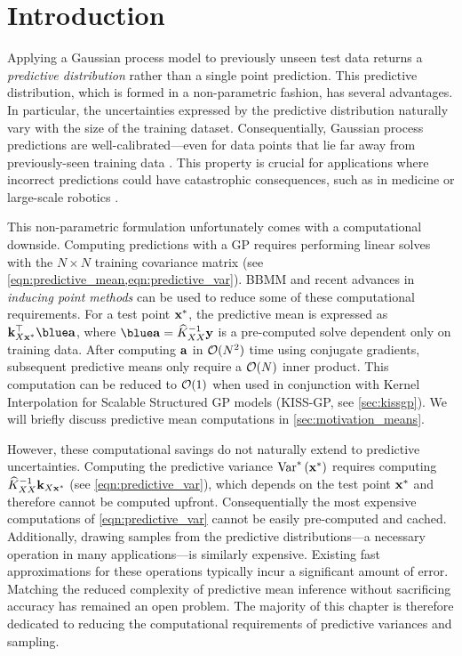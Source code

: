 \section{Introduction}
Applying a Gaussian process model to previously unseen test data returns a \emph{predictive distribution} rather than a single point prediction.
This predictive distribution, which is formed in a non-parametric fashion, has several advantages.
In particular, the uncertainties expressed by the predictive distribution naturally vary with the size of the training dataset.
Consequentially, Gaussian process predictions are well-calibrated---even for data points that lie far away from previously-seen training data \cite{rasmussen2001occam,wilson2014thesis}.
This property is crucial for applications where incorrect predictions could have catastrophic consequences, such as in medicine \cite{schulam2017if} or large-scale robotics \cite{deisenroth2015gaussian}.

This non-parametric formulation unfortunately comes with a computational downside.
Computing predictions with a GP requires performing linear solves with the $N \times N$ training covariance matrix (see \cref{eqn:predictive_mean,eqn:predictive_var}).
BBMM and recent advances in \emph{inducing point methods} can be used to reduce some of these computational requirements.
For a test point $\mathbf{x}^*$, the predictive mean is expressed as $\bk_{\bX\bxtest}^\top {\blue \ba}$, where $\blue \ba = \trainK^{-1} \by$ is a pre-computed solve dependent only on training data.
After computing $\mathbf{a}$ in $\bigo{N^2}$ time using conjugate gradients, subsequent predictive means only require a $\bigo{N}$ inner product.
This computation can be reduced to $\bigo{1}$ when used in conjunction with Kernel Interpolation for Scalable Structured GP models (KISS-GP, see \cref{sec:kissgp}).
We will briefly discuss predictive mean computations in \cref{sec:motivation_means}.

However, these computational savings do not naturally extend to predictive uncertainties.
Computing the predictive variance $\text{Var}^* \left( \mathbf{x}^* \right)$ requires computing $\widehat{K}_{XX}^{-1} \mathbf{k}_{X\mathbf{x}^*}$ (see \cref{eqn:predictive_var}), which depends on the test point $\mathbf{x}^*$ and therefore cannot be computed upfront.
Consequentially the most expensive computations of \cref{eqn:predictive_var} cannot be easily pre-computed and cached.
Additionally, drawing samples from the predictive distributions---a necessary operation in many applications---is similarly expensive.
Existing fast approximations for these operations \cite{papandreou2011efficient,wilson2015thoughts,wang2017max} typically incur a significant amount of error.
Matching the reduced complexity of predictive mean inference without sacrificing accuracy has remained an open problem.
The majority of this chapter is therefore dedicated to reducing the computational requirements of predictive variances and sampling.


